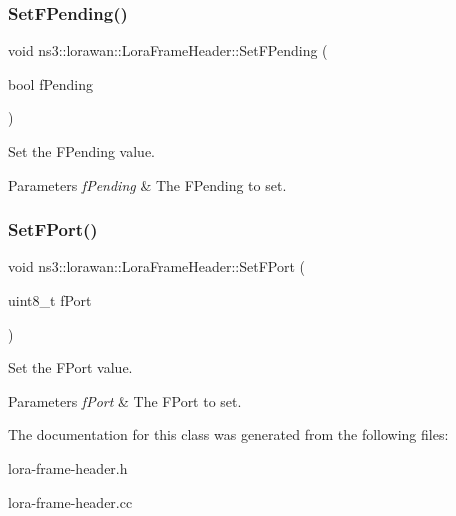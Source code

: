 \subsubsection{\texorpdfstring{Set\+F\+Pending()}{SetFPending()}}
{\footnotesize\ttfamily void ns3\+::lorawan\+::\+Lora\+Frame\+Header\+::\+Set\+F\+Pending (\begin{DoxyParamCaption}\item[{bool}]{f\+Pending }\end{DoxyParamCaption})}

Set the F\+Pending value.


\begin{DoxyParams}{Parameters}
{\em f\+Pending} & The F\+Pending to set. \\
\hline
\end{DoxyParams}
\mbox{\label{classns3_1_1lorawan_1_1LoraFrameHeader_af04f957858d8af6d72288cd44b557090}} 
\subsubsection{\texorpdfstring{Set\+F\+Port()}{SetFPort()}}
{\footnotesize\ttfamily void ns3\+::lorawan\+::\+Lora\+Frame\+Header\+::\+Set\+F\+Port (\begin{DoxyParamCaption}\item[{uint8\+\_\+t}]{f\+Port }\end{DoxyParamCaption})}

Set the F\+Port value.


\begin{DoxyParams}{Parameters}
{\em f\+Port} & The F\+Port to set. \\
\hline
\end{DoxyParams}


The documentation for this class was generated from the following files\+:\begin{DoxyCompactItemize}
\item 
lora-\/frame-\/header.\+h\item 
lora-\/frame-\/header.\+cc\end{DoxyCompactItemize}
